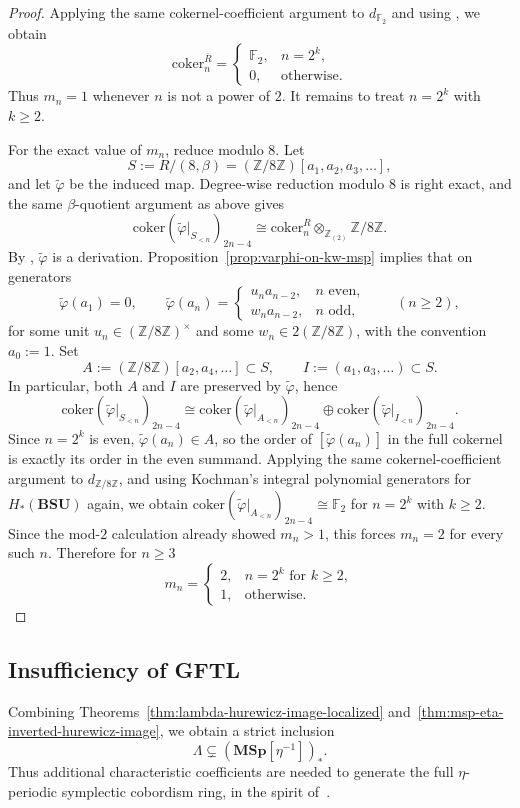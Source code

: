 \documentclass[a4paper]{amsart}
\theoremstyle{plain}
\theoremstyle{definition}
\newcommand{\MSp}{\mathbf{MSp}}
\newcommand{\etainv}{\eta^{-1}}
\newcommand{\MSpetainv}{{\MSp[\etainv]}}
\newcommand{\ZZ}{\mathbb{Z}}
\newcommand{\FF}{\mathbb{F}}
\newcommand{\coker}{\mathrm{coker}}
\renewcommand{\ge}{\geqslant}
\begin{document}
\begin{proof}
	Applying the same cokernel-coefficient argument to $d_{\FF_2}$ and using \cite[Theorem 3.3]{kochman1982polynomial}, we obtain
	\[
		\coker_n^{\bar R}= \begin{cases}
			\FF_2, & n=2^k,            \\
			0,     & \text{otherwise.}
		\end{cases}
	\]
	Thus $m_n=1$ whenever $n$ is not a power of $2$. It remains to treat $n=2^k$ with $k\ge 2$.

	For the exact value of $m_n$, reduce modulo $8$. Let
	\[
		S:=R/(8,\beta)=(\ZZ/8\ZZ)[a_1,a_2,a_3,\ldots],
	\]
	and let $\tilde\varphi$ be the induced map. Degree-wise reduction modulo $8$ is right exact, and the same $\beta$-quotient argument as above gives
	\[
		\coker \left(\tilde\varphi|_{S_{<n}}\right)_{2n-4}\cong \coker_n^R\otimes_{\ZZ_{(2)}}\ZZ/8\ZZ.
	\]
	By \cite[Lemma 8.3]{bachmann2021eta}, $\tilde\varphi$ is a derivation. Proposition~\ref{prop:varphi-on-kw-msp} implies that on generators
	\[
		\tilde\varphi(a_1)=0,\qquad \tilde\varphi(a_n)= \begin{cases}
			u_n a_{n-2}, & n \text{ even}, \\
			w_n a_{n-2}, & n \text{ odd},
		\end{cases}\qquad (n\ge 2),
	\]
	for some unit $u_n \in (\ZZ/8\ZZ)^{\times}$ and some $w_n \in 2(\ZZ/8\ZZ)$, with the convention $a_0:=1$.
	Set
	\[
		A:=(\ZZ/8\ZZ)[a_2,a_4,\ldots]\subset S,\qquad I:=(a_1,a_3,\ldots)\subset S.
	\]
	In particular, both $A$ and $I$ are preserved by $\tilde\varphi$, hence
	\[
		\coker \left(\tilde\varphi|_{S_{<n}}\right)_{2n-4}\cong \coker \left(\tilde\varphi|_{A_{<n}}\right)_{2n-4}\oplus \coker \left(\tilde\varphi|_{I_{<n}}\right)_{2n-4}.
	\]
	Since $n=2^k$ is even, $\tilde\varphi(a_n)\in A$, so the order of $[\tilde\varphi(a_n)]$ in the full cokernel is exactly its order in the even summand. Applying the same cokernel-coefficient argument to $d_{\ZZ/8\ZZ}$, and using Kochman's integral polynomial generators for $H_*(\mathbf{BSU})$ again, we obtain $\coker \left(\tilde\varphi|_{A_{<n}}\right)_{2n-4}\cong \FF_2$ for $n=2^k$ with $k\ge 2$. Since the mod-$2$ calculation already showed $m_n>1$, this forces $m_n=2$ for every such $n$. Therefore for $n \ge 3$
	\[
		m_{n}= \begin{cases}
			2, & n=2^k\text{ for }k \ge 2, \\
			1, & \text{otherwise.}
		\end{cases}
	\]
\end{proof}

\subsection{Insufficiency of GFTL}\label{subsec:insufficiency-gftl}
Combining Theorems~\ref{thm:lambda-hurewicz-image-localized} and~\ref{thm:msp-eta-inverted-hurewicz-image}, we obtain a strict inclusion
\[
	\Lambda \subsetneq (\MSpetainv)_*.
\]
Thus additional characteristic coefficients are needed to generate the full $\eta$-periodic symplectic cobordism ring, in the spirit of~\cite{toda1982the}.
\end{document}
